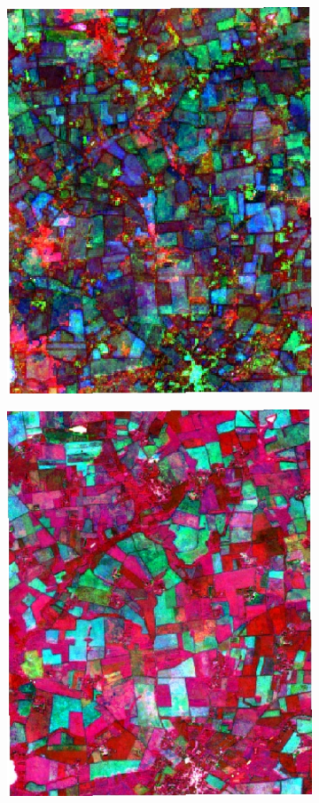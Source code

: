 \documentclass[journal,article,submit,pdftex,moreauthors]{Definitions/mdpi}
\begin{document}
\begin{figure}[H]
\begin{subfigure}[t]{0.23\linewidth}
	\includegraphics[width=0.95\linewidth]{figures/aes_1_layer_mse_results/composites/composite_image_456657.pdf}
    \caption{}
	\label{fig:color_map_e}
	\end{subfigure}
    \begin{subfigure}[t]{0.23\linewidth}
		\centering
	\includegraphics[width=0.95\linewidth]{figures/aes_1_layer_mse_results/composites/composite_image_201032.pdf}

\end{subfigure}
\end{figure}
\end{document}
